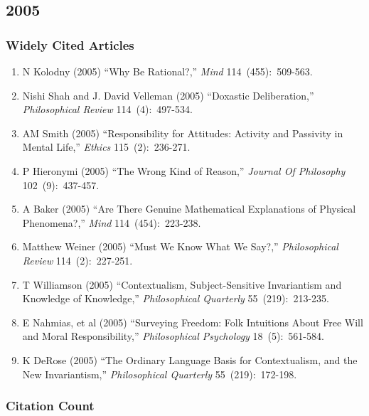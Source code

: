 \documentclass[
  10pt,
  letterpaper,
  DIV=11,
  numbers=noendperiod,
  twoside]{scrartcl}
\providecommand{\tightlist}{%
  \setlength{\itemsep}{0pt}\setlength{\parskip}{0pt}}\usepackage{longtable,booktabs,array}
\begin{document}
\newpage

\subsection{2005}\label{sec-s2005}

\subsubsection*{Widely Cited Articles}\label{widely-cited-articles-48}

\begin{enumerate}
\def\labelenumi{\arabic{enumi}.}
\tightlist
\item
  N Kolodny (2005) ``Why Be Rational?,'' \emph{Mind} 114~(455):~509-563.
\item
  Nishi Shah and J. David Velleman (2005) ``Doxastic Deliberation,''
  \emph{Philosophical Review} 114~(4):~497-534.
\item
  AM Smith (2005) ``Responsibility for Attitudes: Activity and Passivity
  in Mental Life,'' \emph{Ethics} 115~(2):~236-271.
\item
  P Hieronymi (2005) ``The Wrong Kind of Reason,'' \emph{Journal Of
  Philosophy} 102~(9):~437-457.
\item
  A Baker (2005) ``Are There Genuine Mathematical Explanations of
  Physical Phenomena?,'' \emph{Mind} 114~(454):~223-238.
\item
  Matthew Weiner (2005) ``Must We Know What We Say?,''
  \emph{Philosophical Review} 114~(2):~227-251.
\item
  T Williamson (2005) ``Contextualism, Subject-Sensitive Invariantism
  and Knowledge of Knowledge,'' \emph{Philosophical Quarterly}
  55~(219):~213-235.
\item
  E Nahmias, et al (2005) ``Surveying Freedom: Folk Intuitions About
  Free Will and Moral Responsibility,'' \emph{Philosophical Psychology}
  18~(5):~561-584.
\item
  K DeRose (2005) ``The Ordinary Language Basis for Contextualism, and
  the New Invariantism,'' \emph{Philosophical Quarterly}
  55~(219):~172-198.
\end{enumerate}

\subsubsection*{Citation Count}\label{sec-count-2005}
\end{document}
